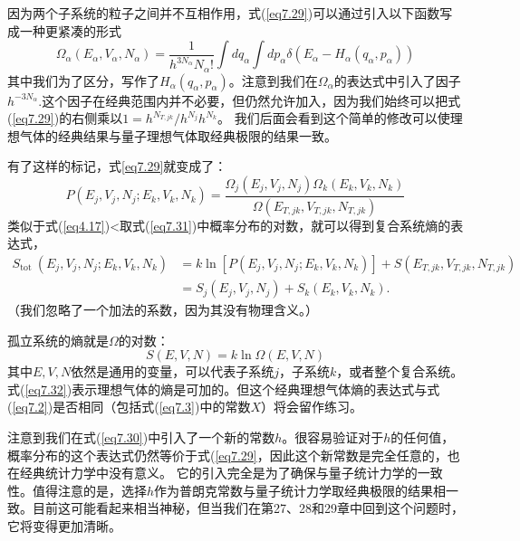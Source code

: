 \documentclass[UTF8]{ctexart}
\numberwithin{equation}{section}%
\numberwithin{figure}{section}%
\begin{document}
    因为两个子系统的粒子之间并不互相作用，式(\ref{eq7.29})可以通过引入以下函数写成一种更紧凑的形式
    \begin{equation}\label{eq7.30}
        \Omega_{\alpha}\left(E_{\alpha}, V_{\alpha}, N_{\alpha}\right)=\frac{1}{h^{3 N_{\alpha}} N_{\alpha} !} \int d q_{\alpha} \int d p_{\alpha} \delta\left(E_{\alpha}-H_{\alpha}\left(q_{\alpha}, p_{\alpha}\right)\right)
        \end{equation}
    其中我们为了区分，写作了$H_\alpha(q_\alpha,p_\alpha)$。注意到我们在$\Omega_\alpha$的表达式中引入了因子$h^{-3N_\alpha}$.这个因子在经典范围内并不必要，但仍然允许加入，因为我们始终可以把式(\ref{eq7.29})的右侧乘以$1=h^{N_{T, j k}} / h^{N_{j}} h^{N_{k}}$。
    我们后面会看到这个简单的修改可以使理想气体的经典结果与量子理想气体取经典极限的结果一致。

    有了这样的标记，式\ref{eq7.29}就变成了：
    \begin{equation}\label{eq7.31}
        P\left(E_{j}, V_{j}, N_{j} ; E_{k}, V_{k}, N_{k}\right)=\frac{\Omega_{j}\left(E_{j}, V_{j}, N_{j}\right) \Omega_{k}\left(E_{k}, V_{k}, N_{k}\right)}{\Omega\left(E_{T, j k}, V_{T, j k}, N_{T, j k}\right)}
        \end{equation}
    类似于式(\ref{eq4.17})<取式(\ref{eq7.31})中概率分布的对数，就可以得到复合系统熵的表达式，
    \begin{equation}\label{eq7.32}
        \begin{aligned}
        S_{\text {tot }}\left(E_{j}, V_{j}, N_{j} ; E_{k}, V_{k}, N_{k}\right) &=k \ln \left[P\left(E_{j}, V_{j}, N_{j} ; E_{k}, V_{k}, N_{k}\right)\right]+S\left(E_{T, j k}, V_{T, j k}, N_{T, j k}\right) \\
        &=S_{j}\left(E_{j}, V_{j}, N_{j}\right)+S_{k}\left(E_{k}, V_{k}, N_{k}\right) .
        \end{aligned}
        \end{equation}
    （我们忽略了一个加法的系数，因为其没有物理含义。）

    孤立系统的熵就是$\Omega$的对数：
    \begin{equation}
        S(E, V, N)=k \ln \Omega(E, V, N)
        \end{equation}
    其中$E,V,N$依然是通用的变量，可以代表子系统$j$，子系统$k$，或者整个复合系统。
    式(\ref{eq7.32})表示理想气体的熵是可加的。但这个经典理想气体熵的表达式与式(\ref{eq7.2})是否相同（包括式(\ref{eq7.3})中的常数$X$）将会留作练习。

    注意到我们在式(\ref{eq7.30})中引入了一个新的常数$h$。很容易验证对于$h$的任何值，概率分布的这个表达式仍然等价于式(\ref{eq7.29}，因此这个新常数是完全任意的，也在经典统计力学中没有意义。
    它的引入完全是为了确保与量子统计力学的一致性。值得注意的是，选择$h$作为普朗克常数与量子统计力学取经典极限的结果相一致。目前这可能看起来相当神秘，但当我们在第27、28和29章中回到这个问题时，它将变得更加清晰。
\end{document}
